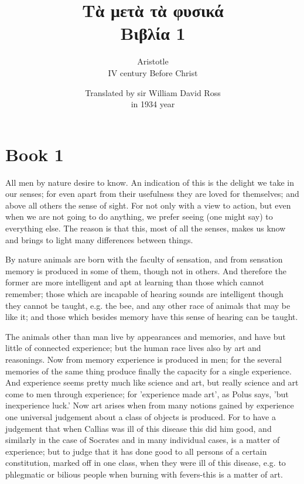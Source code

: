 \documentclass[oneside, 17pt, dvipsnames]{extbook}
\title{
    Τὰ μετὰ τὰ φυσικά
    \\
    Βιβλία 1
}
\author{
    Aristotle
    \\
    IV century Before Christ
}
\date{
    Translated by sir William David Ross
    \\
    in 1934 year
}
\begin{document}
\maketitle
\tableofcontents

\section{Book 1}

All men by nature desire to know. An indication of this is the delight we take in our senses; for even apart from their usefulness they are loved for themselves; and above all others the sense of sight. For not only with a view to action, but even when we are not going to do anything, we prefer seeing (one might say) to everything else. The reason is that this, most of all the senses, makes us know and brings to light many differences between things.

By nature animals are born with the faculty of sensation, and from sensation memory is produced in some of them, though not in others. And therefore the former are more intelligent and apt at learning than those which cannot remember; those which are incapable of hearing sounds are intelligent though they cannot be taught, e.g. the bee, and any other race of animals that may be like it; and those which besides memory have this sense of hearing can be taught.

The animals other than man live by appearances and memories, and have but little of connected experience; but the human race lives also by art and reasonings. Now from memory experience is produced in men; for the several memories of the same thing produce finally the capacity for a single experience. And experience seems pretty much like science and art, but really science and art come to men through experience; for 'experience made art', as Polus says, 'but inexperience luck.' Now art arises when from many notions gained by experience one universal judgement about a class of objects is produced. For to have a judgement that when Callias was ill of this disease this did him good, and similarly in the case of Socrates and in many individual cases, is a matter of experience; but to judge that it has done good to all persons of a certain constitution, marked off in one class, when they were ill of this disease, e.g. to phlegmatic or bilious people when burning with fevers-this is a matter of art.
\end{document}
